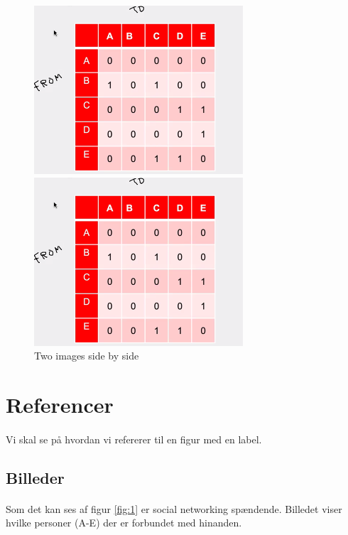 \documentclass{article}
\begin{document}
    \begin{figure}[htb!]
        \begin{minipage}[t]{.5\textwidth}
            \centering
            \includegraphics[scale=1]{images/picture.png}            
        \end{minipage}
        \begin{minipage}[t]{.5\textwidth}
            \centering
            \includegraphics[scale=1]{images/picture.png}            
        \end{minipage}
        \caption{Two images side by side}
    \end{figure}
\newpage
\section{Referencer}
\paragraph{}
Vi skal se på hvordan vi refererer til en figur med en label.
    \subsection{Billeder}        
    \paragraph{}
        Som det kan ses af figur \ref{fig:1} er social networking spændende. Billedet viser hvilke personer (A-E) der er forbundet med hinanden.
\end{document}
